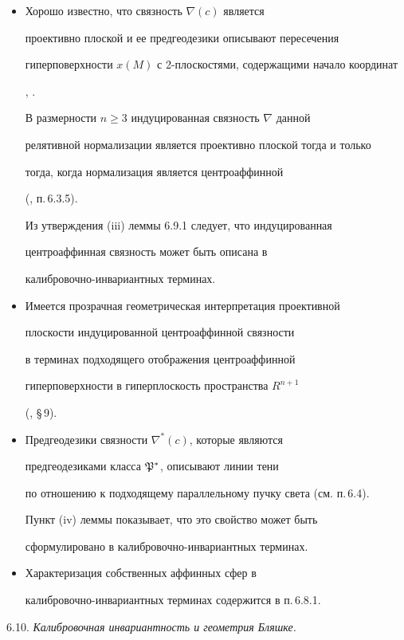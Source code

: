 \begin{itemize}

\item[(a)] Хорошо известно, что связность $\nabla (c)$ является

проективно плоской и ее предгеодезики описывают пересечения

гиперповерхности $x(M)$ с 2-плоскостями, содержащими начало координат

\cite{SCHI}, \cite{SIM-1}.

В размерности $n \ge 3$ индуцированная связность $\nabla$ данной

релятивной нормализации является проективно плоской тогда и только

тогда, когда нормализация является центроаффинной

(\cite{SIM-S-V}, п.\,6.3.5).

Из утверждения (iii) леммы 6.9.1 следует, что индуцированная

центроаффинная связность может быть описана в

калибровочно-инвариантных терминах.

\item[(b)] Имеется прозрачная геометрическая интерпретация проективной

плоскости индуцированной центроаффинной связности

в терминах подходящего отображения центроаффинной

гиперповерхности в гиперплоскость пространства $R^{n+1}$

(\cite{NOM-SI}, \S\,9).

\item[(c)] Предгеодезики связности $\nabla^* (c)$, которые являются

предгеодезиками класса $\frak P^*$, описывают линии тени

по отношению к подходящему параллельному пучку света (см. п.\,6.4).

Пункт (iv) леммы показывает, что это свойство может быть

сформулировано в калибровочно-инвариантных терминах.

\item[(d)] Характеризация собственных аффинных сфер в

калибровочно-инвариантных терминах содержится в п.\,6.8.1.

\end{itemize}



6.10. {\it Калибровочная инвариантность и геометрия Бляшке.}


